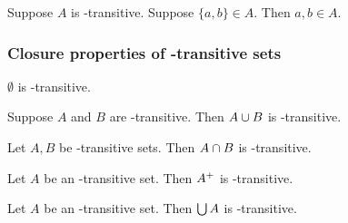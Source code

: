 \begin{proposition}\label{transitiveset_upair}
    Suppose $A$ is \in-transitive.
    Suppose $\{a,b\}\in A$.
    Then $a,b\in A$.
\end{proposition}




\subsubsection{Closure properties of \in-transitive sets}

\begin{proposition}\label{emptyset_transitiveset}
    $\emptyset$ is \in-transitive.
\end{proposition}

\begin{proposition}\label{union_of_transitiveset_is_transitiveset}
    Suppose $A$ and $B$ are \in-transitive.
    Then $A\cup B$ is \in-transitive.
\end{proposition}

\begin{proposition}\label{inter_of_transitiveset_is_transitiveset}
    Let $A, B$ be \in-transitive sets.
    Then $A\cap B$ is \in-transitive.
\end{proposition}

\begin{proposition}\label{suc_of_transitiveset_is_transitiveset}
    Let $A$ be an \in-transitive set.
    Then $A^{+}$ is \in-transitive.
\end{proposition}

\begin{proposition}\label{unions_of_transitiveset_is_transitiveset}
    Let $A$ be an \in-transitive set.
    Then $\bigcup A$ is \in-transitive.
\end{proposition}

